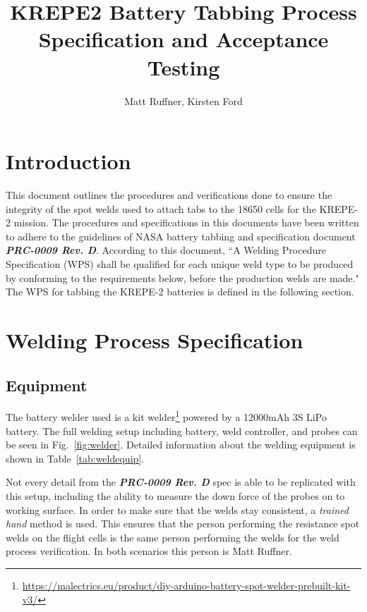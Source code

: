 \documentclass{article}
\title{KREPE2 Battery Tabbing Process Specification and Acceptance Testing}
\author{Matt Ruffner, Kirsten Ford}
\date{}
\begin{document}
\maketitle
\tableofcontents
\listoffigures
\listoftables
\newpage


\section{Introduction}
This document outlines the procedures and verifications done to ensure the integrity of the spot welds used to attach tabs to the 18650 cells for the KREPE-2 mission. The procedures and specifications in this documents have been written to adhere to the guidelines of NASA battery tabbing and specification document \textit{\textbf{PRC-0009 Rev. D}}. According to this document, ``A Welding Procedure Specification (WPS) shall be qualified for each unique weld type to be produced by conforming to the requirements below, before the production welds are made." The WPS for tabbing the KREPE-2 batteries is defined in the following section. 



\section{Welding Process Specification}

\subsection{Equipment}

The battery welder used is a kit welder\footnote{\url{https://malectrics.eu/product/diy-arduino-battery-spot-welder-prebuilt-kit-v3/}} powered by a 12000mAh 3S LiPo battery. The full welding setup including battery, weld controller, and probes can be seen in Fig.~\ref{fig:welder}. Detailed information about the welding equipment is shown in Table~\ref{tab:weldequip}. 

Not every detail from the \textit{\textbf{PRC-0009 Rev. D}} spec is able to be replicated with this setup, including the ability to measure the down force of the probes on to working surface. In order to make sure that the welds stay consistent, a \textit{trained hand} method is used. This ensures that the person performing the resistance spot welds on the flight cells is the same person performing the welds for the weld process verification. In both scenarios this person is Matt Ruffner.
\end{document}
